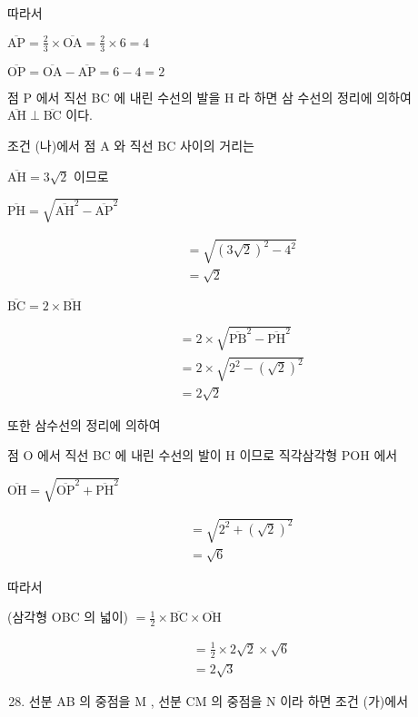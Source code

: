 \documentclass[10pt]{article}
\begin{document}
따라서

\(\overline{\mathrm{AP}}=\frac{2}{3} \times \overline{\mathrm{OA}}=\frac{2}{3} \times 6=4\)

\(\overline{\mathrm{OP}}=\overline{\mathrm{OA}}-\overline{\mathrm{AP}}=6-4=2\)

점 P 에서 직선 BC 에 내린 수선의 발을 H 라 하면 삼 수선의 정리에 의하여 \(\overline{\mathrm{AH}} \perp \overline{\mathrm{BC}}\) 이다.

조건 (나)에서 점 A 와 직선 BC 사이의 거리는

\(\overline{\mathrm{AH}}=3 \sqrt{2}\) 이므로

\(\overline{\mathrm{PH}}=\sqrt{\overline{\mathrm{AH}}^{2}-\overline{\mathrm{AP}}^{2}}\)

\[
\begin{aligned}
& =\sqrt{(3 \sqrt{2})^{2}-4^{2}} \\
& =\sqrt{2}
\end{aligned}
\]

\(\overline{\mathrm{BC}}=2 \times \overline{\mathrm{BH}}\)

\[
\begin{aligned}
& =2 \times \sqrt{\overline{\mathrm{PB}}^{2}-\overline{\mathrm{PH}}^{2}} \\
& =2 \times \sqrt{2^{2}-(\sqrt{2})^{2}} \\
& =2 \sqrt{2}
\end{aligned}
\]

또한 삼수선의 정리에 의하여

점 O 에서 직선 BC 에 내린 수선의 발이 H 이므로 직각삼각형 POH 에서

\(\overline{\mathrm{OH}}=\sqrt{\overline{\mathrm{OP}}^{2}+\overline{\mathrm{PH}}^{2}}\)

\[
\begin{aligned}
& =\sqrt{2^{2}+(\sqrt{2})^{2}} \\
& =\sqrt{6}
\end{aligned}
\]

따라서

(삼각형 OBC 의 넓이) \(=\frac{1}{2} \times \overline{\mathrm{BC}} \times \overline{\mathrm{OH}}\)

\[
\begin{aligned}
& =\frac{1}{2} \times 2 \sqrt{2} \times \sqrt{6} \\
& =2 \sqrt{3}
\end{aligned}
\]

\begin{enumerate}
  \setcounter{enumi}{27}
  \item 선분 AB 의 중점을 M , 선분 CM 의 중점을 N 이라 하면 조건 (가)에서
\end{enumerate}
\end{document}
